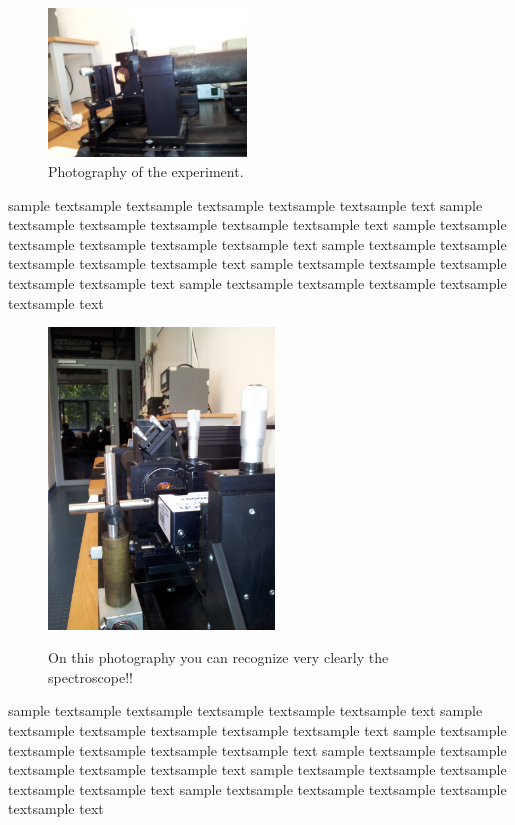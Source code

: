 \begin{figure}
  \begin{center}
    \includegraphics[width=0.47\textwidth]{pics/const4}
  \end{center}
\caption{Photography of the experiment.} 
  \vspace{-10pt}
 \label{fig:const4}

\end{figure}

sample textsample textsample textsample textsample textsample text
sample textsample textsample textsample textsample textsample text
sample textsample textsample textsample textsample textsample text
sample textsample textsample textsample textsample textsample text
sample textsample textsample textsample textsample textsample text
sample textsample textsample textsample textsample textsample text
\begin{figure} 
\caption{On this photography you can recognize very 
    clearly the spectroscope!!} 
\includegraphics[width=6cm]{pics/const3}
 \label{fig:const3}
\end{figure}
sample textsample textsample textsample textsample textsample text
sample textsample textsample textsample textsample textsample text
sample textsample textsample textsample textsample textsample text
sample textsample textsample textsample textsample textsample text
sample textsample textsample textsample textsample textsample text
sample textsample textsample textsample textsample textsample text
